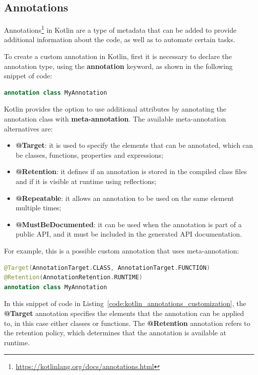 \subsection{Annotations}\label{section:annotation}
Annotations\footnote{\url{https://kotlinlang.org/docs/annotations.html}} in Kotlin are a type of metadata that can be added to provide additional information about the code, as well as to automate certain tasks.

To create a custom annotation in Kotlin, first it is necessary to declare the annotation type, using the \textbf{annotation} keyword, as shown in the following snippet of code:
\begin{lstlisting}[caption={Example of creation of a custom annotation in Kotlin}, language=Kotlin, captionpos=b, label={code:kotlin_annotations_creation}]
annotation class MyAnnotation
\end{lstlisting}

Kotlin provides the option to use additional attributes by annotating the annotation class with \textbf{meta-annotation}. The available meta-annotation alternatives are:
\begin{itemize}
    \item \textbf{@Target}: it is used to specify the elements that can be annotated, which can be classes, functions, properties and expressions;
    \item \textbf{@Retention}: it defines if an annotation is stored in the compiled class files and if it is visible at runtime using reflections;
    \item \textbf{@Repeatable}: it allows an annotation to be used on the same element multiple times;
    \item \textbf{@MustBeDocumented}: it can be used when the annotation is part of a public API, and it must be included in the generated API documentation.
\end{itemize}

For example, this is a possible custom annotation that uses meta-annotation:
\begin{lstlisting}[caption={Example of custom annotation with meta-annotations in Kotlin}, language=Kotlin, captionpos=b, label={code:kotlin_annotations_customization}]
@Target(AnnotationTarget.CLASS, AnnotationTarget.FUNCTION)
@Retention(AnnotationRetention.RUNTIME)
annotation class MyAnnotation
\end{lstlisting}
In this snippet of code in Listing~\ref{code:kotlin_annotations_customization}, the \textbf{@Target} annotation specifies the elements that the annotation can be applied to, in this case either classes or functions. The \textbf{@Retention} annotation refers to the retention policy, which determines that the annotation is available at runtime.

